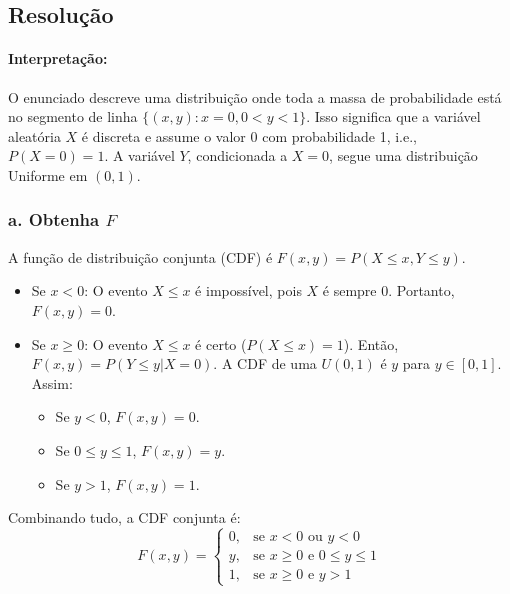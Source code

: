 \documentclass[12pt]{article}
\begin{document}
\subsection*{Resolução}

\paragraph{Interpretação:} O enunciado descreve uma distribuição onde toda a massa de probabilidade está no segmento de linha $\{ (x,y) : x=0, 0 < y < 1 \}$. Isso significa que a variável aleatória $X$ é discreta e assume o valor 0 com probabilidade 1, i.e., $P(X=0)=1$. A variável $Y$, condicionada a $X=0$, segue uma distribuição Uniforme em $(0,1)$.

\subsubsection*{a. Obtenha $F$}
A função de distribuição conjunta (CDF) é $F(x,y) = P(X \le x, Y \le y)$.
\begin{itemize}
    \item Se $x < 0$: O evento $X \le x$ é impossível, pois $X$ é sempre 0. Portanto, $F(x,y)=0$.
    \item Se $x \ge 0$: O evento $X \le x$ é certo ($P(X \le x)=1$). Então, $F(x,y) = P(Y \le y | X=0)$. A CDF de uma $U(0,1)$ é $y$ para $y \in [0,1]$. Assim:
    \begin{itemize}
        \item Se $y < 0$, $F(x,y) = 0$.
        \item Se $0 \le y \le 1$, $F(x,y) = y$.
        \item Se $y > 1$, $F(x,y) = 1$.
    \end{itemize}
\end{itemize}
Combinando tudo, a CDF conjunta é:
\[ F(x,y) = \begin{cases} 0, & \text{se } x < 0 \text{ ou } y < 0 \\ y, & \text{se } x \ge 0 \text{ e } 0 \le y \le 1 \\ 1, & \text{se } x \ge 0 \text{ e } y > 1 \end{cases} \]
\end{document}
